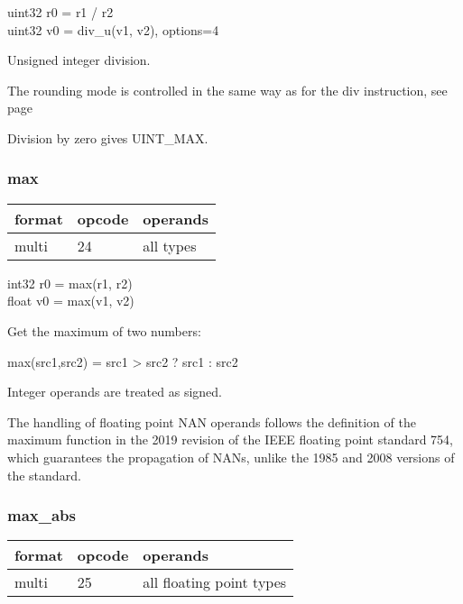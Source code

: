 \documentclass[forwardcom.tex]{subfiles}
\begin{document}
uint32 r0 = r1 / r2 \\
uint32 v0 = div\_u(v1, v2), options=4
\vspace{2mm}

Unsigned integer division.

The rounding mode is controlled in the same way as for the div instruction, see page \pageref{table:DivInstructions}

\vspace{2mm}
Division by zero gives UINT\_MAX.

\subsubsection{max}
\label{table:maxInstruction}
\begin{tabular}{|p{12mm}|p{12mm}|p{110mm}|}
\hline
\bfseries format & \bfseries opcode & \bfseries operands \\ \hline
multi & 24 & all types \\ \hline
\end{tabular}
\vspace{2mm}

int32 r0 = max(r1, r2) \\
float v0 = max(v1, v2)
\vspace{2mm}

Get the maximum of two numbers:

max(src1,src2) = src1 \textgreater{} src2 ? src1 : src2
\vspace{2mm}

Integer operands are treated as signed.
\vspace{2mm}

The handling of floating point NAN operands follows the definition of the maximum function in the 2019 revision of the IEEE floating point standard 754, which guarantees the propagation of NANs, unlike the 1985 and 2008 versions of the standard.
\vspace{2mm}


\subsubsection{max\_abs}
\label{table:maxAbsInstruction}
\begin{tabular}{|p{12mm}|p{12mm}|p{110mm}|}
\hline
\bfseries format & \bfseries opcode & \bfseries operands \\ \hline
multi & 25 & all floating point types \\ \hline
\end{tabular}
\vspace{2mm}
\end{document}
